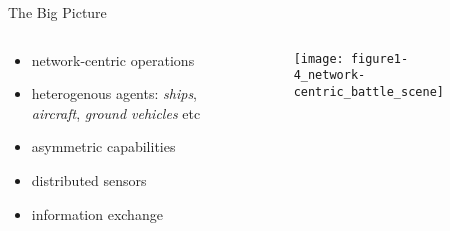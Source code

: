 \documentclass[aspectratio=1610]{beamer}
\begin{document}
\begin{frame}{The Big Picture}

\begin{columns}

\begin{column}{.4\textwidth}
\begin{itemize}
    \item network-centric operations
    \item heterogenous agents: \emph{ships}, \emph{aircraft}, \emph{ground vehicles} etc
    \item asymmetric capabilities
    \item distributed sensors
    \item information exchange
\end{itemize}
\end{column}

\begin{column}{.6\textwidth}
    \begin{figure}
        \centering
        \texttt{[image: figure1-4\_network-centric\_battle\_scene]}
    \end{figure}
\end{column}

\end{columns}

\end{frame}
\end{document}
